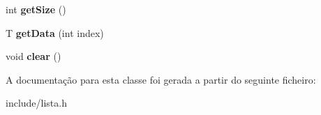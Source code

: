 \begin{DoxyCompactItemize}
\item 
int {\bfseries get\+Size} ()\hypertarget{classList_ae2afa15a07b88a3a678969522cc14988}{}\label{classList_ae2afa15a07b88a3a678969522cc14988}

\item 
T {\bfseries get\+Data} (int index)\hypertarget{classList_a0459a34ea17335fc60d09811320a9a87}{}\label{classList_a0459a34ea17335fc60d09811320a9a87}

\item 
void {\bfseries clear} ()\hypertarget{classList_ae296516a252e11963dbf963727ce429a}{}\label{classList_ae296516a252e11963dbf963727ce429a}

\end{DoxyCompactItemize}


A documentação para esta classe foi gerada a partir do seguinte ficheiro\+:\begin{DoxyCompactItemize}
\item 
include/lista.\+h\end{DoxyCompactItemize}
